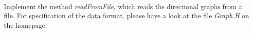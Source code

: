  \\
Implement the method \emph{readFromFile}, which reads the directional graphs 
from a file. For specification of the data format, please have a look at the 
file \emph{Graph.H} on the homepage.